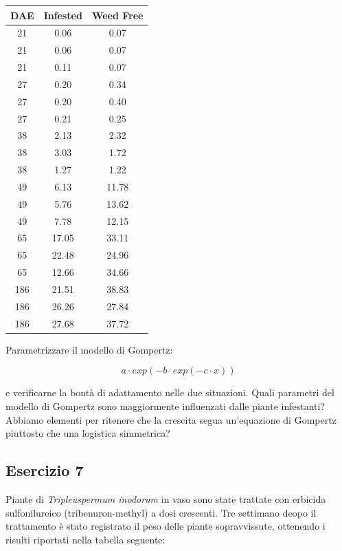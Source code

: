 \documentclass[a4paper,12pt,oneside]{book}
\begin{document}
\begin{longtable}[]{@{}ccc@{}}
\toprule
DAE & Infested & Weed Free \\
\midrule
\endhead
21 & 0.06 & 0.07 \\
21 & 0.06 & 0.07 \\
21 & 0.11 & 0.07 \\
27 & 0.20 & 0.34 \\
27 & 0.20 & 0.40 \\
27 & 0.21 & 0.25 \\
38 & 2.13 & 2.32 \\
38 & 3.03 & 1.72 \\
38 & 1.27 & 1.22 \\
49 & 6.13 & 11.78 \\
49 & 5.76 & 13.62 \\
49 & 7.78 & 12.15 \\
65 & 17.05 & 33.11 \\
65 & 22.48 & 24.96 \\
65 & 12.66 & 34.66 \\
186 & 21.51 & 38.83 \\
186 & 26.26 & 27.84 \\
186 & 27.68 & 37.72 \\
\bottomrule
\end{longtable}

Parametrizzare il modello di Gompertz:

\[a \cdot exp(-b \cdot exp(-c \cdot x))\]

e verificarne la bontà di adattamento nelle due situazioni. Quali parametri del modello di Gompertz sono maggiormente influenzati dalle piante infestanti? Abbiamo elementi per ritenere che la crescita segua un'equazione di Gompertz piuttosto che una logistica simmetrica?

\hypertarget{esercizio-7-2}{%
\subsection{Esercizio 7}\label{esercizio-7-2}}

Piante di \emph{Tripleuspermum inodorum} in vaso sono state trattate con erbicida sulfonilureico (tribenuron-methyl) a dosi crescenti. Tre settimano deopo il trattamento è stato registrato il peso delle piante sopravvissute, ottenendo i risulti riportati nella tabella seguente:
\end{document}
